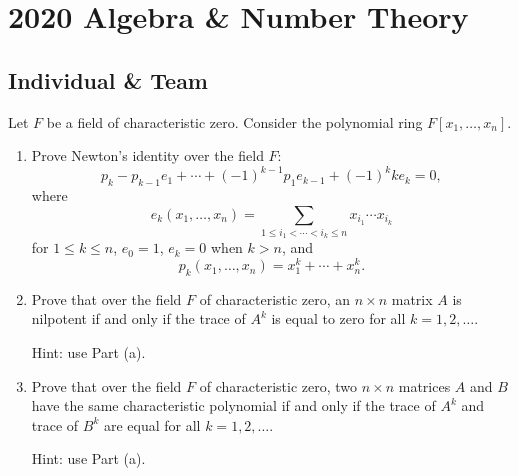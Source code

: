 \section{2020 Algebra \& Number Theory}

\subsection{Individual \& Team}
\begin{exercise}
\label{algebra:2020:1}
Let $F$ be a field of characteristic zero. Consider the polynomial ring $F[x_1, \ldots, x_n]$.

\begin{enumerate}
\item Prove Newton's identity over the field $F$:
\[p_k - p_{k-1}e_1 + \cdots + (-1)^{k-1}p_1e_{k-1} + (-1)^k k e_k = 0,\]
where
\[e_k(x_1, \ldots, x_n) = \sum_{1 \leq i_1 < \cdots < i_k \leq n} x_{i_1} \cdots x_{i_k}\]
for $1 \leq k \leq n$, $e_0 = 1$, $e_k = 0$ when $k > n$, and
\[p_k(x_1, \ldots, x_n) = x_1^k + \cdots + x_n^k.\]

\item Prove that over the field $F$ of characteristic zero, an $n \times n$ matrix $A$ is nilpotent if and only if the trace of $A^k$ is equal to zero for all $k = 1, 2, \ldots$.

Hint: use Part (a).

\item Prove that over the field $F$ of characteristic zero, two $n \times n$ matrices $A$ and $B$ have the same characteristic polynomial if and only if the trace of $A^k$ and trace of $B^k$ are equal for all $k = 1, 2, \ldots$.

Hint: use Part (a).
\end{enumerate}
\end{exercise}

